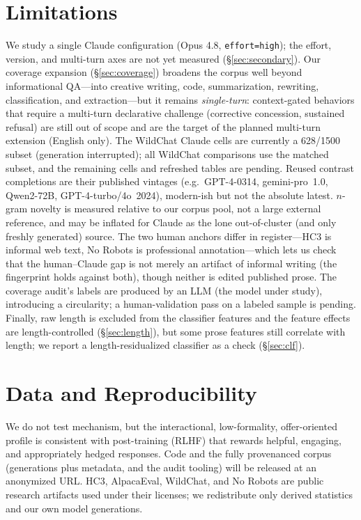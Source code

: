 \documentclass[11pt]{article}
\begin{document}
\section*{Limitations}
We study a single Claude configuration (Opus 4.8, \texttt{effort=high}); the
effort, version, and multi-turn axes are not yet measured (\S\ref{sec:secondary}).
Our coverage expansion (\S\ref{sec:coverage}) broadens the corpus well beyond
informational QA---into creative writing, code, summarization, rewriting,
classification, and extraction---but it remains \emph{single-turn}: context-gated
behaviors that require a multi-turn declarative challenge (corrective concession,
sustained refusal) are still out of scope and are the target of the planned
multi-turn extension (English only). The WildChat Claude cells are currently a
628/1500 subset (generation interrupted); all WildChat comparisons use the matched
subset, and the remaining cells and refreshed tables are pending. Reused contrast
completions are their published vintages (e.g.\ GPT-4-0314, gemini-pro~1.0,
Qwen2-72B, GPT-4-turbo/4o~2024), modern-ish but not the absolute latest. $n$-gram
novelty is measured relative to our corpus pool, not a large external reference,
and may be inflated for Claude as the lone out-of-cluster (and only freshly
generated) source. The two human anchors differ in register---HC3 is informal web
text, No Robots is professional annotation---which lets us check that the
human--Claude gap is not merely an artifact of informal writing (the fingerprint
holds against both), though neither is edited published prose. The coverage
audit's labels are produced by an LLM (the model under study), introducing a
circularity; a human-validation pass on a labeled sample is pending. Finally, raw
length is excluded from the classifier features and the feature effects are
length-controlled (\S\ref{sec:length}), but some prose features still correlate
with length; we report a length-residualized classifier as a check
(\S\ref{sec:clf}).

\section*{Data and Reproducibility}
We do not test mechanism, but the interactional, low-formality, offer-oriented
profile is consistent with post-training (RLHF) that rewards helpful, engaging,
and appropriately hedged responses. Code and the fully provenanced corpus
(generations plus metadata, and the audit tooling) will be released at an
anonymized URL. HC3, AlpacaEval, WildChat, and No Robots are public research
artifacts used under their licenses; we redistribute only derived statistics and
our own model generations.
\end{document}
